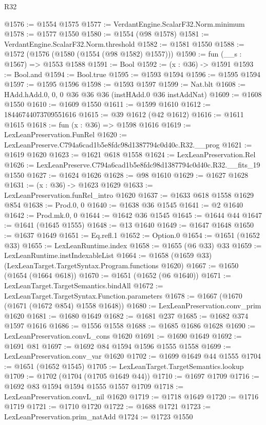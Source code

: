 \begin{lexlean}{R32}
\begin{coremodule}
@1576 := @1554 @1575
@1577 := VerdantEngine.ScalarF32.Norm.minimum
@1578 := @1577 @1550
@1580 := @1554 (@98 @1578)
@1581 := VerdantEngine.ScalarF32.Norm.threshold
@1582 := @1581 @1550
@1588 := @1572 (@1576 (@1580 (@1554 (@98 @1582) @1557)))
@1590 := fun (__s : @1567) => @1553 @1588
@1591 := Bool
@1592 := (x : @36) -> @1591
@1593 := Bool.and
@1594 := Bool.true
@1595 := @1593 @1594
@1596 := @1595 @1594
@1597 := @1595 @1596
@1598 := @1593 @1597
@1599 := Nat.blt
@1608 := HAdd.hAdd.{0, 0, 0} @36 @36 @36 (instHAdd.{0} @36 instAddNat)
@1609 := @1608 @1550
@1610 := @1609 @1550
@1611 := @1599 @1610
@1612 := 18446744073709551616
@1615 := @39 @1612 (@42 @1612)
@1616 := @1611 @1615
@1618 := fun (x : @36) => @1598 @1616
@1619 := LexLeanPreservation.FunRel
@1620 := LexLeanPreserve.C794a6cad1b5e8fdc98d1387794c0d40c.R32.__prog
@1621 := @1619 @1620
@1623 := @1621 @618 @1558
@1624 := LexLeanPreservation.Rel
@1626 := LexLeanPreserve.C794a6cad1b5e8fdc98d1387794c0d40c.R32.__fits_19 @1550
@1627 := @1624 @1626
@1628 := @98 @1610
@1629 := @1627 @1628
@1631 := (x : @36) -> @1623 @1629
@1633 := LexLeanPreservation.funRel_intro @1620
@1637 := @1633 @618 @1558 @1629 @854
@1638 := Prod.{0, 0}
@1640 := @1638 @36 @1545
@1641 := @2 @1640
@1642 := Prod.mk.{0, 0}
@1644 := @1642 @36 @1545
@1645 := @1644 @44
@1647 := @1641 (@1645 @1555)
@1648 := @13 @1640
@1649 := @1647 @1648
@1650 := @1637 @1649
@1651 := Eq.refl.{1}
@1652 := Option.{0}
@1654 := @1651 (@1652 @33)
@1655 := LexLeanRuntime.index
@1658 := @1655 (@6 @33) @33
@1659 := LexLeanRuntime.instIndexableList
@1664 := @1658 (@1659 @33) (LexLeanTarget.TargetSyntax.Program.functions @1620)
@1667 := @1650 (@1654 (@1664 @618))
@1670 := @1651 (@1652 (@6 @1640))
@1671 := LexLeanTarget.TargetSemantics.bindAll
@1672 := LexLeanTarget.TargetSyntax.Function.parameters
@1678 := @1667 (@1670 (@1671 (@1672 @854) @1558 @1648))
@1680 := LexLeanPreservation.conv_prim @1620
@1681 := @1680 @1649
@1682 := @1681 @237
@1685 := @1682 @374 @1597 @1616
@1686 := @1556 @1558
@1688 := @1685 @1686 @1628
@1690 := LexLeanPreservation.convL_cons @1620
@1691 := @1690 @1649
@1692 := @1691 @81
@1697 := @1692 @84 @1594 @1596 @1555 @1558
@1699 := LexLeanPreservation.conv_var @1620
@1702 := @1699 @1649 @44 @1555
@1704 := @1651 (@1652 @1545)
@1705 := LexLeanTarget.TargetSemantics.lookup
@1709 := @1702 (@1704 (@1705 @1649 @44))
@1710 := @1697 @1709
@1716 := @1692 @83 @1594 @1594 @1555 @1557 @1709
@1718 := LexLeanPreservation.convL_nil @1620
@1719 := @1718 @1649
@1720 := @1716 @1719
@1721 := @1710 @1720
@1722 := @1688 @1721
@1723 := LexLeanPreservation.prim_natAdd
@1724 := @1723 @1550

\end{coremodule}
\end{lexlean}
